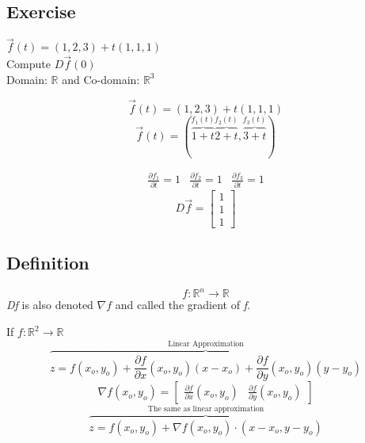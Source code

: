 \documentclass{article}
\begin{document}
\subsection*{Exercise}
$\vec{f}(t)=(1,2,3)+t(1,1,1)$\\[4pt]
Compute $D\vec{f}(0)$\\
Domain: $\mathbb{R}$ and Co-domain: $\mathbb{R}^3$

\[\vec{f}(t)=(1,2,3)+t(1,1,1)\]
\[\vec{f}(t)=(\overbrace{1+t}^{f_{1}(t)}\overbrace{2+t}^{f_{2}(t)},\overbrace{3+t}^{f_{3}(t)})\]

\[\begin{matrix}
    \frac{\partial f_1}{\partial t}=1& \frac{\partial f_2}{\partial t}=1& \frac{\partial f_3}{\partial t}=1
\end{matrix}\]
\[D\vec{f}=\begin{bmatrix}
    1\\
    1\\
    1
\end{bmatrix}\]
\newpage
\subsection{Definition}
\[f: \mathbb{R}^n\rightarrow\mathbb{R}\]
\textit{Df} is also denoted $\nabla f$ and called the gradient of \textit{f}.

If $f: \mathbb{R}^2\rightarrow\mathbb{R}$
\[\overbrace{z=f(x_o,y_o)+\frac{\partial f}{\partial x}(x_o,y_o)(x-x_o)+\frac{\partial f}{\partial y}(x_o,y_o)(y-y_o)}^{\mbox{Linear Approximation}}\]
\[\nabla f(x_o,y_o)=\begin{bmatrix}
    \frac{\partial f}{\partial x}(x_o,y_o)&\frac{\partial f}{\partial y}(x_o,y_o)
\end{bmatrix}\]
\[\overbrace{z=f(x_o,y_o)+\nabla f(x_o,y_o)\cdot (x-x_o,y-y_o)}^{\mbox{The same as linear approximation}}\]
\end{document}
